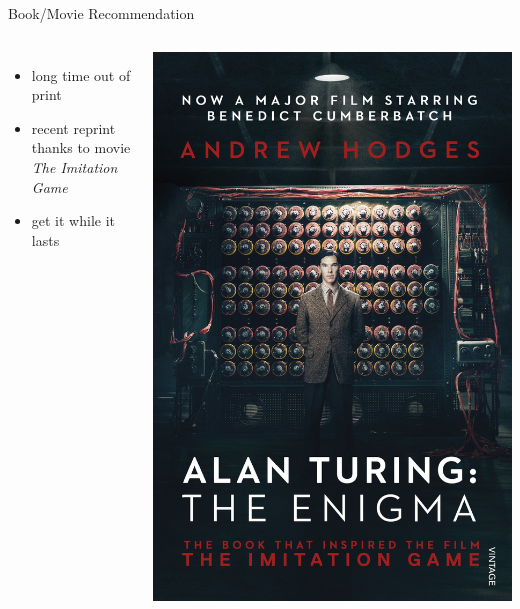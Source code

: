 \documentclass[xcolor={usenames,svgnames,x11names,dvipsnames,table}]{beamer}
\begin{document}
\begin{frame}{Book\slash Movie Recommendation}
    \begin{columns}
            \begin{itemize}
                \item long time out of print
                \item recent reprint thanks to movie\\
                    \emph{The Imitation Game}
                \item get it while it lasts
            \end{itemize}
            \includegraphics[width=1\linewidth]{./img/enigma_book.jpg}
    \end{columns}
\end{frame}
\end{document}
